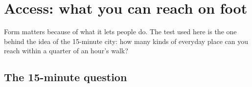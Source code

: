 \chapter{Access: what you can reach on foot}\label{ch:access}

Form matters because of what it lets people do. The test used here is the one behind the idea of the 15-minute city: how many kinds of everyday place can you reach within a quarter of an hour's walk?

\section{The 15-minute question}

